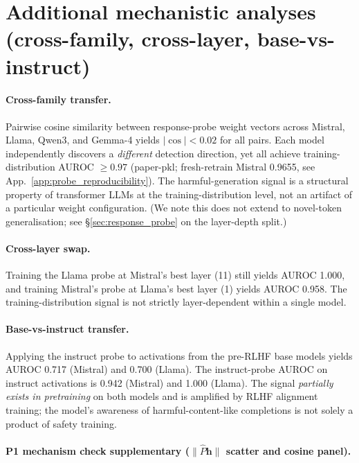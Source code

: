 \documentclass{article}
\begin{document}
\section{Additional mechanistic analyses (cross-family, cross-layer, base-vs-instruct)}
\label{app:additional_mech}

\paragraph{Cross-family transfer.}
Pairwise cosine similarity between response-probe weight vectors across Mistral, Llama, Qwen3, and Gemma-4 yields $|\cos|<0.02$ for all pairs. Each model independently discovers a \emph{different} detection direction, yet all achieve training-distribution AUROC $\geq 0.97$ (paper-pkl; fresh-retrain Mistral 0.9655, see App.~\ref{app:probe_reproducibility}). The harmful-generation signal is a structural property of transformer LLMs at the training-distribution level, not an artifact of a particular weight configuration. (We note this does not extend to novel-token generalisation; see \S\ref{sec:response_probe} on the layer-depth split.)

\paragraph{Cross-layer swap.}
Training the Llama probe at Mistral's best layer (11) still yields AUROC 1.000, and training Mistral's probe at Llama's best layer (1) yields AUROC 0.958. The training-distribution signal is not strictly layer-dependent within a single model.

\paragraph{Base-vs-instruct transfer.}
Applying the instruct probe to activations from the pre-RLHF base models yields AUROC 0.717 (Mistral) and 0.700 (Llama). The instruct-probe AUROC on instruct activations is 0.942 (Mistral) and 1.000 (Llama). The signal \emph{partially exists in pretraining} on both models and is amplified by RLHF alignment training; the model's awareness of harmful-content-like completions is not solely a product of safety training.

\paragraph{P1 mechanism check supplementary ($\|\hat{P}\mathbf{h}\|$ scatter and cosine panel).}
\label{app:p1_cos}
\end{document}
